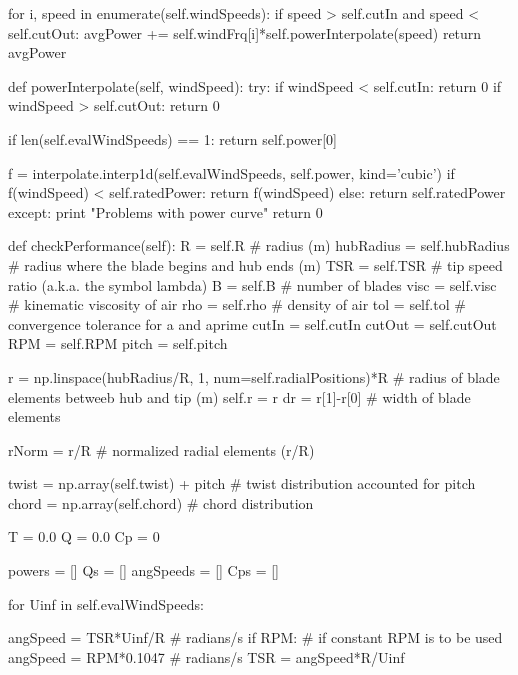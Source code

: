 \begin{pythoncode}
            for i, speed in enumerate(self.windSpeeds):
                if speed > self.cutIn and speed < self.cutOut:
                    avgPower += self.windFrq[i]*self.powerInterpolate(speed)
            return avgPower

    def powerInterpolate(self, windSpeed):
        try:
            if windSpeed < self.cutIn:
                return 0
            if windSpeed > self.cutOut:
                return 0
            
            if len(self.evalWindSpeeds) == 1:
                return self.power[0]  

            f = interpolate.interp1d(self.evalWindSpeeds, self.power, kind='cubic')
            if f(windSpeed) < self.ratedPower:
                return f(windSpeed)
            else:
                return self.ratedPower
        except:
            print "Problems with power curve"
            return 0

    def checkPerformance(self):
        R = self.R # radius (m)
        hubRadius = self.hubRadius # radius where the blade begins and hub ends (m)
        TSR = self.TSR # tip speed ratio (a.k.a. the symbol lambda)
        B = self.B # number of blades
        visc = self.visc # kinematic viscosity of air 
        rho = self.rho # density of air 
        tol = self.tol # convergence tolerance for a and aprime
        cutIn = self.cutIn
        cutOut = self.cutOut
        RPM = self.RPM
        pitch = self.pitch

        r = np.linspace(hubRadius/R, 1, num=self.radialPositions)*R # radius of blade elements betweeb hub and tip (m)
        self.r = r
        dr = r[1]-r[0] # width of blade elements

        rNorm = r/R # normalized radial elements (r/R)

        twist = np.array(self.twist) + pitch # twist distribution accounted for pitch
        chord = np.array(self.chord) # chord distribution

        T = 0.0
        Q = 0.0
        Cp = 0

        powers = []
        Qs = []
        angSpeeds = []
        Cps = []

        

        for Uinf in self.evalWindSpeeds:
            
            angSpeed = TSR*Uinf/R # radians/s
            if RPM: # if constant RPM is to be used
                angSpeed = RPM*0.1047 # radians/s
                TSR = angSpeed*R/Uinf


\end{pythoncode}
